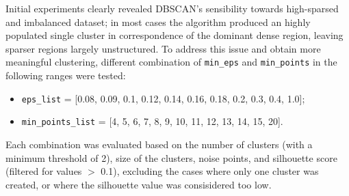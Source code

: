 Initial experiments clearly revealed DBSCAN's sensibility towards high-sparsed and imbalanced dataset;
in most cases the algorithm produced an highly populated single cluster in correspondence of the dominant dense region, leaving sparser regions largely unstructured. 
To address this issue and obtain more meaningful clustering, different combination of \texttt{min\_eps} and \texttt{min\_points} in the following ranges were tested:
\begin{itemize}
    \item \texttt{eps\_list} =  [0.08, 0.09, 0.1, 0.12, 0.14, 0.16, 0.18, 0.2, 0.3, 0.4, 1.0];
    \item \texttt{min\_points\_list} =  [4, 5, 6, 7, 8, 9, 10, 11, 12, 13, 14, 15, 20].
\end{itemize}

Each combination was evaluated based on the number of clusters (with a minimum threshold of 2), size of the clusters, noise points, and silhouette score 
(filtered for values $>$ 0.1), excluding the cases where only one cluster was created, or where the silhouette value was consisidered too low.



